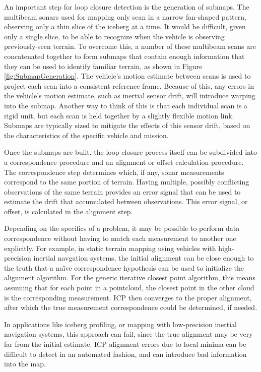 An important step for loop closure detection is the generation of submaps. The multibeam sonars used for mapping only scan in a narrow fan-shaped pattern, observing only a thin slice of the iceberg at a time. It would be difficult, given only a single slice, to be able to recognize when the vehicle is observing previously-seen terrain. To overcome this, a number of these multibeam scans are concatenated together to form submaps that contain enough information that they can be used to identify familiar terrain, as shown in Figure \ref{fig:SubmapGeneration}. The vehicle's motion estimate between scans is used to project each scan into a consistent reference frame. Because of this, any errors in the vehicle's motion estimate, such as inertial sensor drift, will introduce warping into the submap. Another way to think of this is that each individual scan is a rigid unit, but each scan is held together by a slightly flexible motion link. Submaps are typically sized to mitigate the effects of this sensor drift, based on the characteristics of the specific vehicle and mission.

Once the submaps are built, the loop closure process itself can be subdivided into a correspondence procedure and an alignment or offset calculation procedure. The correspondence step determines which, if any, sonar measurements correspond to the same portion of terrain. Having multiple, possibly conflicting observations of the same terrain provides an error signal that can be used to estimate the drift that accumulated between observations. This error signal, or offset, is calculated in the alignment step. 

Depending on the specifics of a problem, it may be possible to perform data correspondence without having to match each measurement to another one explicitly. For example, in static terrain mapping using vehicles with high-precision inertial navgation systems, the initial alignment can be close enough to the truth that a na\"ive correspondence hypothesis can be used to initialize the alignment algorithm. For the generic iterative closest point algorithm, this means assuming that for each point in a pointcloud, the closest point in the other cloud is the corresponding measurement. ICP then converges to the proper alignment, after which the true measurement correspondence could be determined, if needed. 

In applications like iceberg profiling, or mapping with low-precision inertial navigation systems, this approach can fail, since the true alignment may be very far from the initial estimate. ICP alignment errors due to local minima can be difficult to detect in an automated fashion, and can introduce bad information into the map. 

